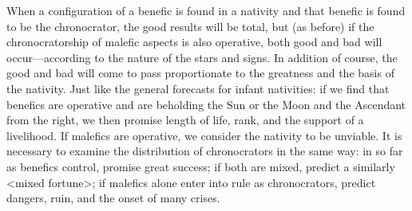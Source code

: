 When a configuration of a benefic is found in a nativity and that benefic is found to be the chronocrator, the good results will be total,
but (as before) if the chronocratorship of malefic aspects is also operative, both good and bad will occur—according to the nature of the stars and signs. In addition of course, the good and bad will come to pass proportionate to the greatness and the basis of the nativity. Just like the general forecasts for infant nativities: if we find that benefics are operative and are beholding the Sun or the Moon and the Ascendant from the right, we then promise length of life, rank, and the support of a livelihood. If malefics are operative, we consider the nativity to be unviable. It is necessary to examine the distribution of
chronocrators in the same way: in so far as benefics control, promise great success; if both are mixed, predict a similarly <mixed fortune>; if malefics alone enter into rule as chronocrators, predict dangers, ruin, and the onset of many crises.

